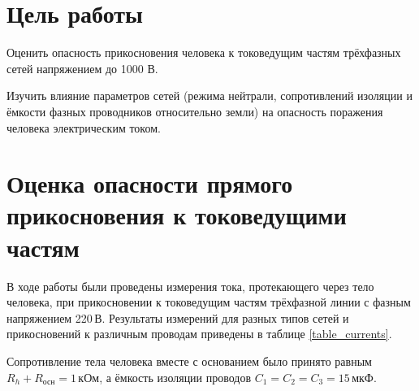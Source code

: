 

\usepackage{pdfpages}
\usepackage{adjustbox}
\usepackage{array}
\usepackage{multirow}
\pgfplotsset{compat=1.18}
\usetikzlibrary{arrows.meta}
\usepackage[europeanresistors, americaninductors, straightvoltages]{circuitikz}


	
	
	\setcounter{page}{2}
	
	\section*{Цель работы}
	
	Оценить опасность прикосновения человека к токоведущим частям
	трёхфазных сетей напряжением до 1000 В.
	
	Изучить	влияние	параметров сетей (режима нейтрали, сопротивлений изоляции и ёмкости фазных проводников относительно земли) на опасность поражения человека электрическим током.
	
	\section{Оценка опасности прямого прикосновения к токоведущими частям}
	
	В ходе работы были проведены измерения тока, протекающего через тело человека, при прикосновении к токоведущим частям трёхфазной линии с фазным напряжением 220\,В. Результаты измерений для разных типов сетей и прикосновений к различным проводам приведены в таблице \ref{table_currents}.
	
	Сопротивление тела человека вместе с основанием было принято равным $R_h + R_{\text{осн}} = 1\,\text{кОм}$, а ёмкость изоляции проводов $C_1 = C_2 = C_3 = 15\,\text{мкФ}$.
	

